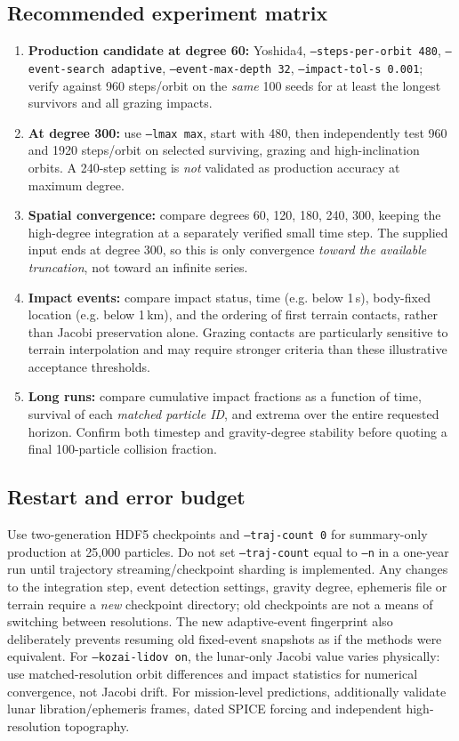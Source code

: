 \documentclass[11pt,a4paper]{article}
\newcommand{\opt}[1]{\texttt{#1}}
\begin{document}
\subsection{Recommended experiment matrix}
\begin{enumerate}[leftmargin=*]
\item \textbf{Production candidate at degree 60:} Yoshida4, \opt{--steps-per-orbit 480},
\opt{--event-search adaptive}, \opt{--event-max-depth 32},
\opt{--impact-tol-s 0.001}; verify against 960 steps/orbit on the \emph{same}
100 seeds for at least the longest survivors and all grazing impacts.
\item \textbf{At degree 300:} use \opt{--lmax max}, start with 480,
then independently test 960 and 1920 steps/orbit on selected surviving,
grazing and high-inclination orbits. A 240-step setting is \emph{not}
validated as production accuracy at maximum degree.
\item \textbf{Spatial convergence:} compare degrees 60, 120, 180, 240,
300, keeping the high-degree integration at a separately verified small time
step. The supplied input ends at degree 300, so this is only convergence
\emph{toward the available truncation}, not toward an infinite series.
\item \textbf{Impact events:} compare impact status, time (e.g. below 1\,s),
body-fixed location (e.g. below 1\,km), and the ordering of first terrain
contacts, rather than Jacobi preservation alone. Grazing contacts are
particularly sensitive to terrain interpolation and may require stronger
criteria than these illustrative acceptance thresholds.
\item \textbf{Long runs:} compare cumulative impact fractions as a function
of time, survival of each \emph{matched particle ID}, and extrema over the
entire requested horizon. Confirm both timestep and gravity-degree stability
before quoting a final 100-particle collision fraction.
\end{enumerate}
\subsection{Restart and error budget}
Use two-generation HDF5 checkpoints and \opt{--traj-count 0} for summary-only production at 25,000 particles. Do not set \opt{--traj-count} equal to \opt{--n} in a one-year run until trajectory streaming/checkpoint sharding is implemented. Any changes to the
integration step, event detection settings, gravity degree, ephemeris file
or terrain require a \emph{new} checkpoint directory; old checkpoints are
not a means of switching between resolutions. The new adaptive-event fingerprint
also deliberately prevents resuming old fixed-event snapshots as if the
methods were equivalent.
For \opt{--kozai-lidov on}, the lunar-only Jacobi value varies physically:
use matched-resolution orbit differences and impact statistics for numerical
convergence, not Jacobi drift. For mission-level predictions, additionally
validate lunar libration/ephemeris frames, dated SPICE forcing and independent
high-resolution topography.
\end{document}
